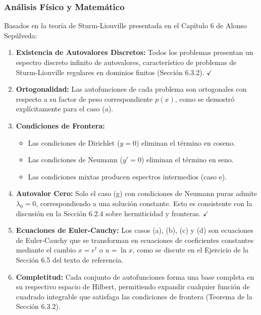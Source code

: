 \documentclass[a4paper]{article}
\begin{document}
\subsubsection{Análisis Físico y Matemático}

Basados en la teoría de Sturm-Liouville presentada en el Capítulo 6 de Alonso Sepúlveda:

\begin{enumerate}
    \item \textbf{Existencia de Autovalores Discretos:} Todos los problemas presentan un espectro discreto infinito de autovalores, característico de problemas de Sturm-Liouville regulares en dominios finitos (Sección 6.3.2). $\checkmark$
    
    \item \textbf{Ortogonalidad:} Las autofunciones de cada problema son ortogonales con respecto a su factor de peso correspondiente $p(x)$, como se demostró explícitamente para el caso (a).
    
    \item \textbf{Condiciones de Frontera:} 
    \begin{itemize}
        \item Las condiciones de Dirichlet ($y=0$) eliminan el término en coseno.
        \item Las condiciones de Neumann ($y'=0$) eliminan el término en seno.
        \item Las condiciones mixtas producen espectros intermedios (caso e).
    \end{itemize}
    
    \item \textbf{Autovalor Cero:} Solo el caso (g) con condiciones de Neumann puras admite $\lambda_0 = 0$, correspondiendo a una solución constante. Esto es consistente con la discusión en la Sección 6.2.4 sobre hermiticidad y fronteras. $\checkmark$
    
    \item \textbf{Ecuaciones de Euler-Cauchy:} Los casos (a), (b), (c) y (d) son ecuaciones de Euler-Cauchy que se transforman en ecuaciones de coeficientes constantes mediante el cambio $x = e^t$ o $u = \ln x$, como se discute en el Ejercicio de la Sección 6.5 del texto de referencia.
    
    \item \textbf{Completitud:} Cada conjunto de autofunciones forma una base completa en su respectivo espacio de Hilbert, permitiendo expandir cualquier función de cuadrado integrable que satisfaga las condiciones de frontera (Teorema de la Sección 6.3.2).
\end{enumerate}
\end{document}
